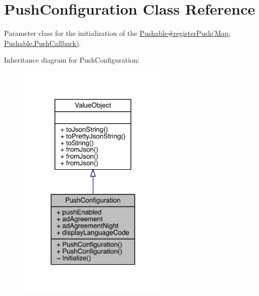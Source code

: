 \hypertarget{classcom_1_1toast_1_1android_1_1gamebase_1_1base_1_1push_1_1_push_configuration}{}\section{Push\+Configuration Class Reference}
\label{classcom_1_1toast_1_1android_1_1gamebase_1_1base_1_1push_1_1_push_configuration}


Parameter class for the initialization of the \hyperlink{}{Pushable\#register\+Push(\+Map, Pushable.\+Push\+Callback)}.  




Inheritance diagram for Push\+Configuration\+:\nopagebreak
\begin{figure}[H]
\begin{center}
\leavevmode
\includegraphics[width=204pt]{classcom_1_1toast_1_1android_1_1gamebase_1_1base_1_1push_1_1_push_configuration__inherit__graph}
\end{center}
\end{figure}



